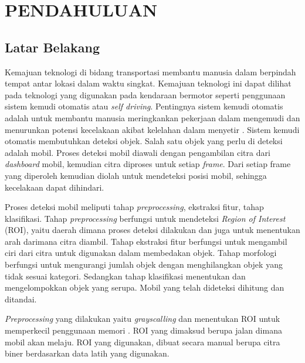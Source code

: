 \chapter{PENDAHULUAN}

\vspace{4.5pt}

\section{Latar Belakang} \label{sec:latar_belakang}

Kemajuan teknologi di bidang transportasi membantu manusia dalam berpindah tempat antar lokasi dalam waktu singkat. Kemajuan teknologi ini dapat dilihat pada teknologi yang digunakan pada kendaraan bermotor seperti penggunaan sistem kemudi otomatis atau \textit{self driving}. Pentingnya sistem kemudi otomatis adalah untuk membantu manusia meringkankan pekerjaan dalam mengemudi dan menurunkan potensi kecelakaan akibat kelelahan dalam menyetir \cite{bougharriou}. Sistem kemudi otomatis membutuhkan deteksi objek. Salah satu objek yang perlu di deteksi adalah mobil. Proses deteksi mobil diawali dengan pengambilan citra dari \textit{dashboard} mobil, kemudian citra diproses untuk setiap \textit{frame}. Dari setiap frame yang diperoleh kemudian diolah untuk mendeteksi posisi mobil, sehingga kecelakaan dapat dihindari.
 
Proses deteksi mobil meliputi tahap \textit{preprocessing}, ekstraksi fitur, tahap klasifikasi. Tahap \textit{preprocessing} berfungsi untuk mendeteksi \textit{Region of Interest} (ROI), yaitu daerah dimana proses deteksi dilakukan dan juga untuk menentukan arah darimana citra diambil. Tahap ekstraksi fitur berfungsi untuk mengambil ciri dari citra untuk digunakan dalam membedakan objek. Tahap morfologi berfungsi untuk mengurangi jumlah objek dengan menghilangkan objek yang tidak sesuai kategori. Sedangkan tahap klasifikasi menentukan dan mengelompokkan objek yang serupa. Mobil yang telah dideteksi dihitung dan ditandai.

\textit{Preprocessing} yang dilakukan yaitu \textit{grayscalling} dan menentukan ROI untuk memperkecil penggunaan memori \cite{prahara}. ROI yang dimaksud berupa jalan dimana mobil akan melaju. ROI yang digunakan, dibuat secara manual berupa citra biner berdasarkan data latih yang digunakan.

